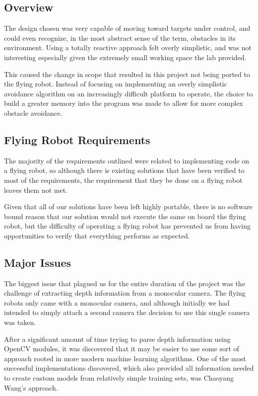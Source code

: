 \documentclass{article}[12]
\begin{document}
\subsection{Overview}

	The design chosen was very capable of moving toward targets under control, and could even recognize, in the most abstract sense of the term, obstacles in its environment. Using a totally reactive approach felt overly simplistic, and was not interesting especially given the extremely small working space the lab provided.
	
	This caused the change in scope that resulted in this project not being ported to the flying robot. Instead of focusing on implementing an overly simplistic avoidance algorithm on an increasingly difficult platform to operate, the choice to build a greater memory into the program was made to allow for more complex obstacle avoidance.
	
	
\subsection{Flying Robot Requirements}

The majority of the requirements outlined were related to implementing code on a flying robot, so although there is existing solutions that have been verified to most of the requirements, the requirement that they be done on a flying robot leaves them not met.

Given that all of our solutions have been left highly portable, there is no software bound reason that our solution would not execute the same on board the flying robot, but the difficulty of operating a flying robot has prevented us from having opportunities to verify that everything performs as expected.

\subsection{Major Issues}

The biggest issue that plagued us for the entire duration of the project was the challenge of extracting depth information from a monocular camera. The flying robots only came with a monocular camera, and although initially we had intended to simply attach a second camera the decision to use this single camera was taken.

After a significant amount of time trying to parse depth information using OpenCV modules, it was discovered that it may be easier to use some sort of approach rooted in more modern machine learning algorithms. One of the most successful implementations discovered, which also provided all information needed to create custom models from relatively simple training sets, was Chaoyang Wang's approach.\cite{Wang_2018_CVPR} 
\end{document}
